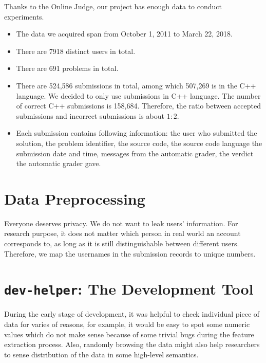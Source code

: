     Thanks to the Online Judge, our project has enough data to conduct experiments.

    \begin{itemize}
        \item The data we acquired span from October 1, 2011 to March 22, 2018.
        \item There are 7918 distinct users in total.
        \item There are 691 problems in total.
        \item There are 524,586 submissions in total, among which 507,269 is in the C++ language.
            We decided to only use submissions in C++ language.
            The number of correct C++ submissions is 158,684.
            Therefore, the ratio between accepted submissions and incorrect submissions is about $1:2$.
        \item Each submission contains following information:
            the user who submitted the solution,
            the problem identifier,
            the source code,
            the source code language
            the submission date and time,
            messages from the automatic grader,
            the verdict the automatic grader gave.
    \end{itemize}

\section{Data Preprocessing}

    Everyone deserves privacy. We do not want to leak users' information.
    For research purpose, it does not matter which person in real world an account corresponds to,
    as long as it is still distinguishable between different users.
    Therefore, we map the usernames in the submission records to unique numbers.

\section{\texttt{dev-helper}: The Development Tool}

    During the early stage of development,
    it was helpful to check individual piece of data for varies of reasons,
    for example, it would be easy to spot some numeric values which do not make sense
    because of some trivial bugs during the feature extraction process.
    Also, randomly browsing the data might also help researchers to sense distribution of the data
    in some high-level semantics.

